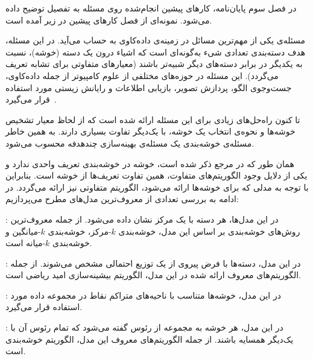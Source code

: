 

در فصل سوم پایان‌نامه، کارهای پیشین انجام‌شده روی مسئله به تفصیل توضیح داده می‌شود.
نمونه‌ای از فصل کارهای پیشین در زیر آمده است.



مسئله‌ی  یکی از مهم‌ترین مسائل در زمینه‌ی داده‌کاوی به حساب می‌آید.
در این مسئله، هدف دسته‌بندی تعدادی شیء به‌گونه‌ای است که اشیاء درون یک دسته (خوشه)، نسبت به یکدیگر در برابر دسته‌های دیگر شبیه‌تر باشند (معیارهای متفاوتی برای تشابه تعریف می‌گردد).
این مسئله در حوزه‌های مختلفی از علوم کامپیوتر از جمله داده‌کاوی، جست‌وجوی الگو، پردازش تصویر، بازیابی اطلاعات و رایانش زیستی مورد استفاده قرار می‌گیرد~.

تا کنون راه‌حل‌های زیادی برای این مسئله ارائه شده است که از لحاظ معیار تشخیص خوشه‌ها و نحوه‌ی انتخاب یک خوشه، با یک‌دیگر تفاوت بسیاری دارند.
به همین خاطر مسئله‌ی خوشه‌بندی یک مسئله‌ی بهینه‌سازی چندهدفه محسوب می‌شود.


همان طور که در مرجع  ذکر شده است، خوشه در خوشه‌بندی تعریف واحدی ندارد و یکی از دلایل وجود الگوریتم‌های متفاوت، همین تفاوت تعریف‌ها از خوشه است.
بنابراین با توجه به مدلی که برای خوشه‌ها ارائه می‌شود، الگوریتم متفاوتی نیز ارائه می‌گردد.
در ادامه به بررسی تعدادی از معروف‌ترین مدل‌های مطرح می‌پردازیم:


: در این مدل‌ها، هر دسته با یک مرکز نشان داده می‌شود.
از جمله معروف‌ترین روش‌های خوشه‌بندی بر اساس این مدل،  خوشه‌بندی $k$-مرکز، خوشه‌بندی $k$-میانگین و خوشه‌بندی $k$-میانه است.

: در این مدل، دسته‌ها با فرض پیروی از یک توزیع احتمالی مشخص می‌شوند.
از جمله الگوریتم‌های معروف ارائه شده در این مدل، الگوریتم بیشینه‌سازی امید ریاضی است.

: در این مدل، خوشه‌ها متناسب با ناحیه‌های متراکم نقاط در مجموعه داده مورد استفاده قرار می‌گیرد.

: در این مدل، هر خوشه به مجموعه از رئوس گفته می‌شود که تمام رئوس آن با یک‌دیگر همسایه باشند.
از جمله الگوریتم‌های معروف این مدل، الگوریتم خوشه‌بندی  است.


